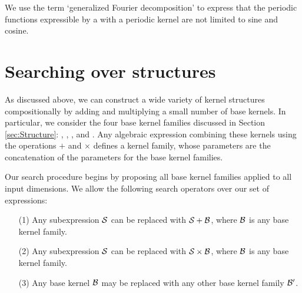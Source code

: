 \documentclass[twoside]{article}
\begin{document}
We use the term `generalized Fourier decomposition' to express that the periodic functions expressible by a \gp{} with a periodic kernel are not limited to sine and cosine.




%





\section{Searching over structures}
\label{sec:Search}

As discussed above, we can construct a wide variety of kernel structures compositionally by adding and multiplying a small number of base kernels.
In particular, we consider the four base kernel families discussed in Section \ref{sec:Structure}: \kSE, \kPer, \kLin, and \kRQ.
Any algebraic expression combining these kernels using the operations $+$ and $\times$ defines a kernel family, whose parameters are the concatenation of the parameters for the base kernel families. 

Our search procedure begins by proposing all base kernel families applied to all input dimensions. 
We allow the following search operators over our set of expressions:
\begin{itemize}
\item[(1)] Any subexpression ${\cal S}$ can be replaced with ${\cal S} + {\cal B}$, where ${\cal B}$ is any base kernel family.
\item[(2)] Any subexpression ${\cal S}$ can be replaced with ${\cal S} \times {\cal B}$, where ${\cal B}$ is any base kernel family.
\item[(3)] Any base kernel ${\cal B}$ may be replaced with any other base kernel family ${\cal B}^\prime$.
\end{itemize}
\end{document}
